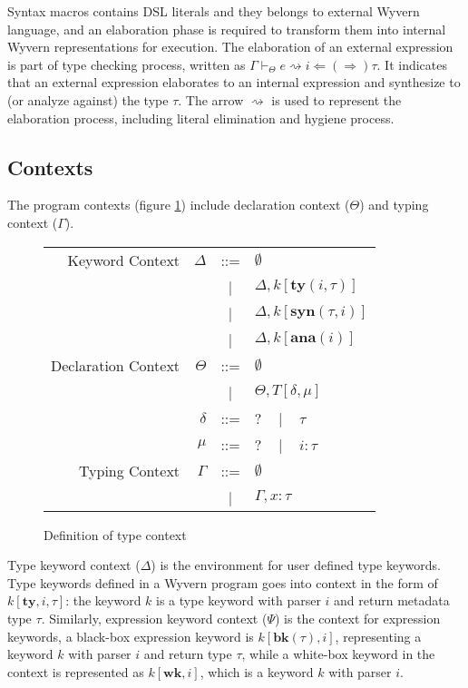 \documentclass{sig-alternate}
\newcommand{\mycaption}[1]{\vspace{-4px}\caption{#1}\vspace{-2px}}
\begin{document}
Syntax macros contains DSL literals and they belongs to external Wyvern language, and an elaboration phase is required to transform them into internal Wyvern representations for execution. The elaboration of an external expression is part of type checking process, written as $\Gamma\vdash_{\Theta} e\rightsquigarrow i \Leftarrow(\Rightarrow) \tau$. It indicates that an external expression elaborates to an internal expression and synthesize to (or analyze against) the type $\tau$. The arrow $\rightsquigarrow$ is used to represent the elaboration process, including literal elimination and hygiene process.

\subsection{Contexts}
The program contexts (figure \ref{typechecking-environment}) include declaration context ($\Theta$) and typing context ($\Gamma$). 

\begin{figure}[ht]
\begin{center}
\begin{tabular}{r r c l}
Keyword Context       & $\Delta$  & ::=   & $\emptyset$\\
                      &           &   |   & $\Delta,k[\mathbf{ty}(i,\tau)]$\\
                      &           &   |   & $\Delta,k[\mathbf{syn}(\tau,i)]$\\
                      &           &   |   & $\Delta,k[\mathbf{ana}(i)]$\\
Declaration Context   & $\Theta$  & ::=   & $\emptyset$\\
                      &           &   |   & $\Theta,T[\delta,\mu]$\\
                      & $\delta$  &  ::=  & $?$ ~ | ~ $\tau$\\
                      & $\mu$     &  ::=  & $?$ ~ | ~ $i:\tau$\\
Typing Context        & $\Gamma$  &  ::=  & $\emptyset$\\
                      &           &   |   & $\Gamma,x:\tau$
\end{tabular}
\end{center}
\mycaption{Definition of type context}
\label{typechecking-environment}
\end{figure}

Type keyword context ($\Delta$) is the environment for user defined type keywords. Type keywords defined in a Wyvern program goes into context in the form of $k[\mathbf{ty},i,\tau]$: the keyword $k$ is a type keyword with parser $i$ and return metadata type $\tau$. Similarly, expression keyword context ($\Psi$) is the context for expression keywords, a black-box expression keyword is $k[\mathbf{bk}(\tau),i]$, representing a keyword $k$ with parser $i$ and return type $\tau$, while a white-box keyword in the context is represented as $k[\mathbf{wk},i]$, which is a keyword $k$ with parser $i$.
\end{document}
